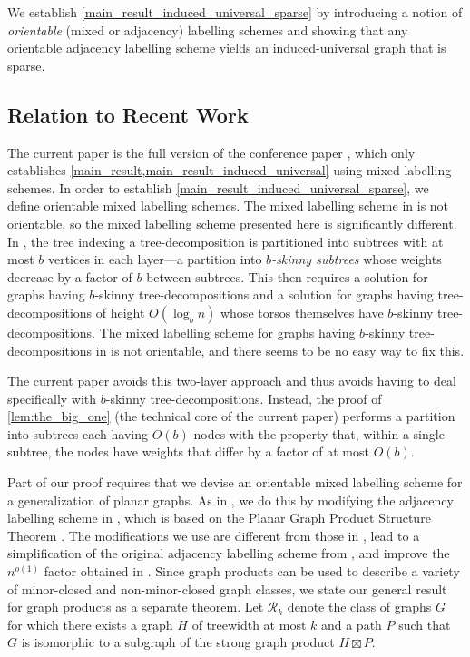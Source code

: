 \documentclass{patmorin}
\newcommand{\Oh}{O}
\newcommand{\calR}{\mathcal{R}}
\begin{document}
We establish \cref{main_result_induced_universal_sparse} by introducing a notion of \emph{orientable} (mixed or adjacency) labelling schemes and showing that any orientable adjacency labelling scheme yields an induced-universal graph that is sparse.

\subsection{Relation to Recent Work}

The current paper is the full version of the conference paper \cite{dujmovic.gavoille.ea:adjacency_minor}, which only establishes \cref{main_result,main_result_induced_universal} using mixed labelling schemes.  In order to establish \cref{main_result_induced_universal_sparse}, we define orientable mixed labelling schemes.  The mixed labelling scheme in \cite{dujmovic.gavoille.ea:adjacency_minor} is not orientable, so the mixed labelling scheme presented here is significantly different. In \cite{dujmovic.gavoille.ea:adjacency_minor}, the tree indexing a tree-decomposition is partitioned into subtrees with at most $b$ vertices in each layer---a partition into \emph{$b$-skinny subtrees} whose weights decrease by a factor of $b$ between subtrees.  This then requires a solution for graphs having $b$-skinny tree-decompositions and a solution for graphs having tree-decompositions of height $\Oh(\log_b n)$ whose torsos themselves have $b$-skinny tree-decompositions. The mixed labelling scheme for graphs having $b$-skinny tree-decompositions in \cite{dujmovic.gavoille.ea:adjacency_minor} is not orientable, and there seems to be no easy way to fix this.

The current paper avoids this two-layer approach and thus avoids having to deal specifically with $b$-skinny tree-decompositions. Instead, the proof of \cref{lem:the_big_one} (the technical core of the current paper) performs a partition into subtrees each having $\Oh(b)$ nodes with the property that, within a single subtree, the nodes have weights that differ by a factor of at most $\Oh(b)$.  

Part of our proof requires that we devise an orientable mixed labelling scheme for a generalization of planar graphs. As in \cite{EJM23}, we do this by modifying the adjacency labelling scheme in \cite{dujmovic.esperet.ea:adjacency}, which is based on the Planar Graph Product Structure Theorem  \cite{dujmovic.joret.ea:planar}.  The modifications we use are different from those in \cite{EJM23}, lead to a simplification of the original adjacency labelling scheme from \cite{dujmovic.esperet.ea:adjacency}, and improve the $n^{o(1)}$ factor obtained in \cite{EJM23}.  Since graph products can be used to describe a variety of minor-closed and non-minor-closed graph classes, we state our general result for graph products as a separate theorem.  Let $\calR_k$ denote the class of graphs $G$ for which there exists a graph $H$ of treewidth at most $k$ and a path $P$ such that $G$ is isomorphic to a subgraph of the strong graph product $H\boxtimes P$.
\end{document}
